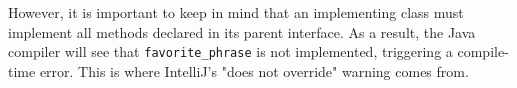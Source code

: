 \begin{parts}
\begin{blocksection}
\begin{solution}[0.5in]
However, it is important to keep in mind that an implementing class must implement all methods declared in its parent interface.
As a result, the Java compiler will see that \lstinline{favorite_phrase} is not implemented, triggering a compile-time error.
This is where IntelliJ's "does not override" warning comes from.
\end{solution}
\end{blocksection}

\end{parts}
